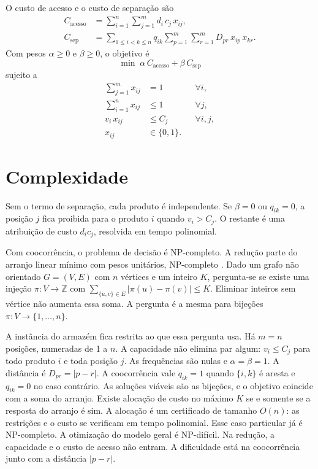 \documentclass[conference,a4paper]{IEEEtran}
\begin{document}
O custo de acesso e o custo de separação são
\begin{align}
C_{\mathrm{acesso}} &= \sum_{i=1}^{n} \sum_{j=1}^{m} d_i \, c_j \, x_{ij}, \\
C_{\mathrm{sep}} &= \sum_{1 \le i < k \le n} q_{ik} \sum_{p=1}^{m} \sum_{r=1}^{m} D_{pr} \, x_{ip} \, x_{kr}.
\end{align}
Com pesos \(\alpha \ge 0\) e \(\beta \ge 0\), o objetivo é
\begin{equation}
\min \; \alpha \, C_{\mathrm{acesso}} + \beta \, C_{\mathrm{sep}}
\end{equation}
sujeito a
\begin{align}
\sum_{j=1}^{m} x_{ij} &= 1 && \forall i, \\
\sum_{i=1}^{n} x_{ij} &\le 1 && \forall j, \\
v_i \, x_{ij} &\le C_j && \forall i,j, \\
x_{ij} &\in \{0,1\}.
\end{align}

\section{Complexidade}
Sem o termo de separação, cada produto é independente.
Se \(\beta = 0\) ou \(q_{ik} = 0\), a posição \(j\) fica proibida para o produto \(i\) quando \(v_i > C_j\).
O restante é uma atribuição de custo \(d_i c_j\), resolvida em tempo polinomial.

Com coocorrência, o problema de decisão é NP-completo.
A redução parte do arranjo linear mínimo com pesos unitários, NP-completo \cite{garey1976}.
Dado um grafo não orientado \(G=(V,E)\) com \(n\) vértices e um inteiro \(K\), pergunta-se se existe uma injeção \(\pi\colon V \to \mathbb{Z}\) com \(\sum_{\{u,v\}\in E} |\pi(u)-\pi(v)| \le K\).
Eliminar inteiros sem vértice não aumenta essa soma.
A pergunta é a mesma para bijeções \(\pi\colon V \to \{1,\ldots,n\}\).

A instância do armazém fica restrita ao que essa pergunta usa.
Há \(m = n\) posições, numeradas de 1 a \(n\).
A capacidade não elimina par algum: \(v_i \le C_j\) para todo produto \(i\) e toda posição \(j\).
As frequências são nulas e \(\alpha = \beta = 1\).
A distância é \(D_{pr} = |p-r|\).
A coocorrência vale \(q_{ik} = 1\) quando \(\{i,k\}\) é aresta e \(q_{ik} = 0\) no caso contrário.
As soluções viáveis são as bijeções, e o objetivo coincide com a soma do arranjo.
Existe alocação de custo no máximo \(K\) se e somente se a resposta do arranjo é sim.
A alocação é um certificado de tamanho \(O(n)\): as restrições e o custo se verificam em tempo polinomial.
Esse caso particular já é NP-completo.
A otimização do modelo geral é NP-difícil.
Na redução, a capacidade e o custo de acesso não entram.
A dificuldade está na coocorrência junto com a distância \(|p-r|\).
\end{document}
